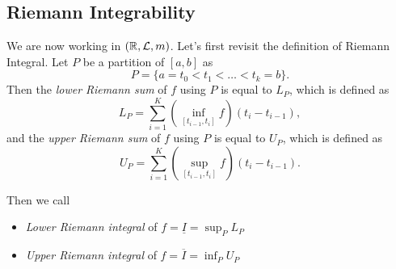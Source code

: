\subsection{Riemann Integrability}
We are now working in \((\mathbb{\MakeUppercase{r}} , \mathcal{\MakeUppercase{l}} , m)\). Let's first revisit the definition of
Riemann Integral. Let \(P\) be a partition of \([a, b]\) as
\[
	P = \{a = t_0 < t_1 < \ldots < t_k = b \}.
\]
Then the \emph{lower Riemann sum} of \(f\) using \(P\) is equal to \(L_P\), which is defined as
\[
	L_{P} = \sum\limits_{i=1}^{K} \left(\inf _{[t_{i-1}, t_{i}]} f \right)(t_{i} - t_{i - 1}),
\]
and the \emph{upper Riemann sum} of \(f\) using \(P\) is equal to \(U_P\), which is defined as
\[
	U_{P} = \sum\limits_{i=1}^{K} \left(\sup _{[t_{i-1}, t_{i}]} f \right)(t_{i} - t_{i - 1}).
\]

Then we call
\begin{itemize}
	\item \emph{Lower Riemann integral} of \(f = \underline{I} = \sup_P L_{P} \)
	\item \emph{Upper Riemann integral} of \(f = \overline{I}  = \inf_P U_{P} \)
\end{itemize}

